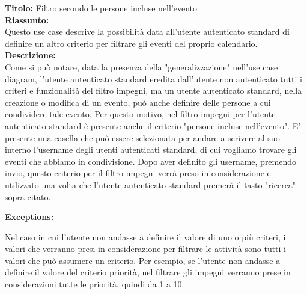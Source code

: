 \begin{listaPersonale}[UC]{}
\begin{listaPersonale2}[UC] {}
    \textbf{Titolo: } Filtro secondo le persone incluse nell'evento \\
    \textbf{Riassunto: } \\ Questo use case descrive la possibilità data all'utente autenticato standard di definire un altro criterio per filtrare gli eventi del proprio calendario.\\ 
    \textbf{Descrizione: } \\ Come si può notare, data la presenza della "generalizzazione" nell'use case diagram, l'utente autenticato standard eredita dall'utente non autenticato tutti i criteri e funzionalità del filtro impegni, ma un utente autenticato standard, nella creazione o modifica di un evento, può anche definire delle persone a cui condividere tale evento. Per questo motivo, nel filtro impegni per l'utente autenticato standard è presente anche il criterio "persone incluse nell'evento". E' presente una casella che può essere selezionata per andare a scrivere al suo interno l'username degli utenti autenticati standard, di cui vogliamo trovare gli eventi che abbiamo in condivisione. 
    Dopo aver definito gli username, premendo invio, questo criterio per il filtro impegni verrà preso in considerazione e utilizzato una volta che l'utente autenticato standard premerà il tasto "ricerca" sopra citato.

    \textbf{Exceptions:}
    \begin{enumerate}[label=\textbf{[exception \arabic{enumiii}]}, ref= \textbf{[exception \arabic{enumiii}]}]
         Nel caso in cui l'utente non andasse a definire il valore di uno o più criteri, i valori che verranno presi in considerazione per filtrare le attività sono tutti i valori che può assumere un criterio. Per esempio, se l'utente non andasse a definire il valore del criterio priorità, nel filtrare gli impegni verranno prese in considerazioni tutte le priorità, quindi da 1 a 10.
    \end{enumerate}
    \end{listaPersonale2}




    \newpage
    

\end{listaPersonale}

